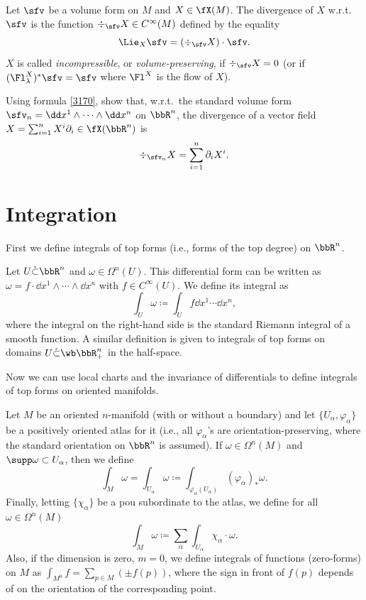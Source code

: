 \begin{defn}
    Let $\sfv$ be a volume form on $M$ and $X\in \fX(M)$. The divergence of $X$ w.r.t.\ $\sfv$ is the function $\div_\sfv X\in C^\infty(M)$ defined by the equality
    \[\Lie_X\sfv =(\div_{\sfv} X)\cdot \sfv.\label{eq def divergence}\]
    $X$ is called \emph{incompressible}, or \emph{volume-preserving}, if $\div_\sfv X=0$ (or if $(\Fl^X_\lambda)^\ast\sfv=\sfv$ where $\Fl^X$ is the flow of $X$).
\end{defn}


\begin{xca}
    Using formula \eqref{3170}, show that, w.r.t.\ the standard volume form $\sfv_n=\dd x^1\wedge \cdots\wedge\dd x^n$ on $\bbR^n$, the divergence of a vector field $X=\sum_{i=1}^n X^i\partial_i\in\fX(\bbR^n)$ is 
    \[\div_{\sfv_n} X=\sum_{i=1}^n \partial_i X^i.\]
\end{xca}









\section{Integration}

First we define integrals of top forms (i.e., forms of the top degree) on $\bbR^n$.
\begin{defn}
    Let $U\mathring\subset \bbR^n$ and $\omega\in \Omega^n(U)$. This differential form can be written as $\omega=f\cdot \dd x^1\wedge\cdots\wedge\dd x^n $ with $f\in C^\infty(U)$. We define its integral as
    \[\int_U\omega \coloneqq \int_U f \dd x^1\cdots\dd x^n,\]
    where the integral on the right-hand side is the standard Riemann integral of a smooth function. A similar definition is given to integrals of top forms on domains $U\mathring\subset \wb\bbR^n_+$ in the half-space.
\end{defn}

Now we can use local charts and the invariance of differentials to define integrals of top forms on oriented manifolds.

\begin{defn}
    Let $M$ be an oriented $n$-manifold (with or without a boundary) and let $\{U_\alpha,\varphi_\alpha\}$ be a positively oriented atlas for it (i.e., all $\varphi_\alpha$'s are orientation-preserving, where the standard orientation on $\bbR^n$ is assumed). If $\omega\in\Omega^n(M)$ and $\supp\omega\subset U_\alpha$, then we define
    \[\int_M \omega= \int_{U_\alpha}\omega \coloneqq \int_{\varphi_\alpha( U_\alpha)}(\varphi_\alpha)_\ast \omega.\]
    Finally, letting $\{\chi_\alpha\}$ be a \gls{pou} subordinate to the atlas, we define for all $\omega\in\Omega^n(M)$
    \[\int_M \omega\coloneqq \sum_\alpha \int_{U_\alpha}\chi_\alpha\cdot\omega.\]
    Also, if the dimension is zero, $m=0$, we define integrals of functions (zero-forms) on $M$ as $\int_{M^0}f=\sum_{p\in M}(\pm f(p))$, where the sign in front of $f(p)$ depends of on the orientation of the corresponding point.
\end{defn}


